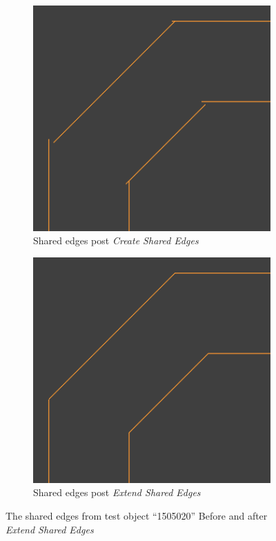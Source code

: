 \begin{figure}[htb]
	\centering
	\begin{subfigure}{0.45\textwidth}
		\centering
		\includegraphics[width=\linewidth]{../resources/geo_simp/1505020_shared_edges.png}
		\caption{Shared edges post \textit{Create Shared Edges}}
		\label{sfig:gs_shared_edges}
	\end{subfigure}
	\hfill
	\begin{subfigure}{0.45\textwidth}
		\centering
		\includegraphics[width=\linewidth]{../resources/geo_simp/1505020_shared_edges_clamped.png}
		\caption{Shared edges post \textit{Extend Shared Edges}}
		\label{sfig:gs_shared_edges_clamped}
	\end{subfigure}
\caption{
The shared edges from test object ``1505020'' Before and after \textit{Extend Shared Edges}
}
	\label{fig:extend_shared_edges}
\end{figure}

